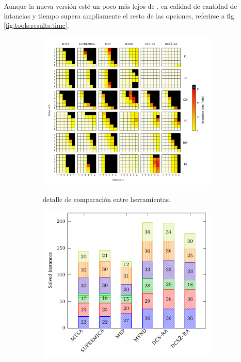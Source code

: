 Aunque la nueva versión esté un poco más lejos de \MYND, en calidad de cantidad de intancias y tiempo supera ampliamente el resto de las opciones, referirse a fig \ref{fig:tools:results:time}.
\begin{figure}[th]
    \centering
    \hspace*{-20mm}
    \begin{subfigure}{0.7\textwidth}
        \includegraphics[width=\linewidth]{figures/benchmark/tools_vs.pdf}\label{fig:tools:results:detailed}
        \caption{detalle de comparación entre herramientas.}
    \end{subfigure}%
    \begin{subfigure}{0.5\textwidth}
        \includegraphics[width=0.9\linewidth]{figures/benchmark/tools_instances.pdf}

\end{subfigure}
\end{figure}

